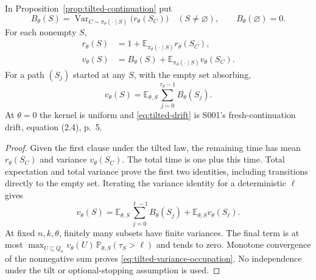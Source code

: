 \begin{proposition}
\label{prop:tilted-occupation}
In Proposition~\ref{prop:tilted-continuation} put
\[
 B_\theta(S)=\operatorname{Var}_{C\sim\pi_\theta(\cdot\mid S)}
                  \bigl(r_\theta(S_C)\bigr)
 \quad(S\ne\varnothing),\qquad B_\theta(\varnothing)=0.
\]
For each nonempty $S$,
\begin{align}
 r_\theta(S)&=1+\mathbb E_{\pi_\theta(\cdot\mid S)}r_\theta(S_C),
 \label{eq:tilted-drift}\\
 v_\theta(S)&=B_\theta(S)+
                 \mathbb E_{\pi_\theta(\cdot\mid S)}v_\theta(S_C).
 \label{eq:tilted-local-variance}
\end{align}
For a path $(S_j)$ started at any $S$, with the empty set absorbing,
\begin{equation}
 v_\theta(S)=
 \mathbb E_{\theta,S}\sum_{j=0}^{\tau_S-1}B_\theta(S_j).
 \label{eq:tilted-variance-occupation}
\end{equation}
At $\theta=0$ the kernel is uniform and \eqref{eq:tilted-drift} is
S001's fresh-continuation drift, equation (2.4), p.~5.
\end{proposition}
\begin{proof}
Given the first clause under the tilted law, the remaining time has mean
$r_\theta(S_C)$ and variance $v_\theta(S_C)$. The total time is one plus
this time. Total expectation and total variance prove the first two
identities, including transitions directly to the empty set.
Iterating the variance identity for a deterministic $\ell$ gives
\[
 v_\theta(S)=
 \mathbb E_{\theta,S}\sum_{j=0}^{\ell-1}B_\theta(S_j)
 +\mathbb E_{\theta,S}v_\theta(S_\ell).
\]
At fixed $n,k,\theta$, finitely many subsets have finite variances.
The final term is at most
$\max_{U\subseteq Q_n}v_\theta(U)\,
\mathbb P_{\theta,S}(\tau_S>\ell)$ and tends to zero.
Monotone convergence of the nonnegative sum proves
\eqref{eq:tilted-variance-occupation}. No independence under the tilt
or optional-stopping assumption is used.
\end{proof}


